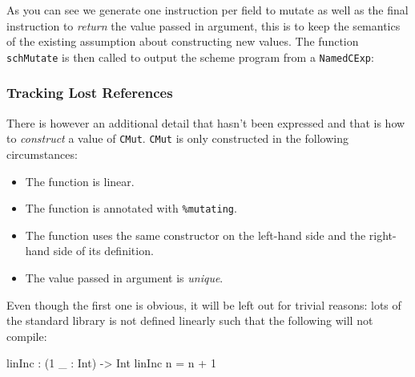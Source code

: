 \documentclass[
]{article}
\newenvironment{Shaded}{}{}
\newcommand{\DataTypeTok}[1]{\textcolor[rgb]{0.56,0.13,0.00}{#1}}
\newcommand{\DecValTok}[1]{\textcolor[rgb]{0.25,0.63,0.44}{#1}}
\newcommand{\FunctionTok}[1]{\textcolor[rgb]{0.02,0.16,0.49}{#1}}
\newcommand{\NormalTok}[1]{#1}
\newcommand{\OperatorTok}[1]{\textcolor[rgb]{0.40,0.40,0.40}{#1}}
\newcommand{\OtherTok}[1]{\textcolor[rgb]{0.00,0.44,0.13}{#1}}
\providecommand{\tightlist}{%
  \setlength{\itemsep}{0pt}\setlength{\parskip}{0pt}}
\begin{document}
As you can see we generate one instruction per field to mutate as well
as the final instruction to \emph{return} the value passed in argument,
this is to keep the semantics of the existing assumption about
constructing new values. The function \texttt{schMutate} is then called
to output the scheme program from a \texttt{NamedCExp}:

\begin{Shaded}
\end{Shaded}

\hypertarget{tracking-lost-references}{%
\subsubsection{Tracking Lost
References}\label{tracking-lost-references}}

There is however an additional detail that hasn't been expressed and
that is how to \emph{construct} a value of \texttt{CMut}. \texttt{CMut}
is only constructed in the following circumstances:

\begin{itemize}
\tightlist
\item
  The function is linear.
\item
  The function is annotated with \texttt{\%mutating}.
\item
  The function uses the same constructor on the left-hand side and the
  right-hand side of its definition.
\item
  The value passed in argument is \emph{unique}.
\end{itemize}

Even though the first one is obvious, it will be left out for trivial
reasons: lots of the standard library is not defined linearly such that
the following will not compile:

\begin{Shaded}
\begin{Highlighting}[]
\NormalTok{linInc }\OperatorTok{:}\NormalTok{ (}\DecValTok{1}\NormalTok{ \_ }\OperatorTok{:} \DataTypeTok{Int}\NormalTok{) }\OtherTok{{-}\textgreater{}} \DataTypeTok{Int}
\NormalTok{linInc n }\OtherTok{=}\NormalTok{ n }\OperatorTok{+} \DecValTok{1}
\end{Highlighting}
\end{Shaded}
\end{document}
